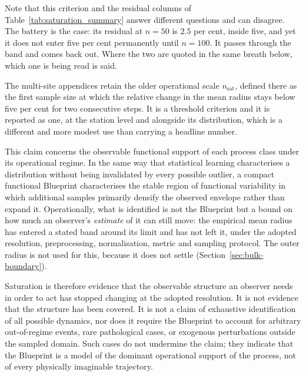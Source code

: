 \documentclass[10pt]{article}
\theoremstyle{plain}
\theoremstyle{definition}
\theoremstyle{remark}
\newcommand{\fitwidth}[1]{%
  \resizebox{\ifdim\width>\linewidth\linewidth\else\width\fi}{!}{#1}}
\begin{document}
Note that this criterion and the residual columns of
Table~\ref{tab:saturation_summary} answer different questions and can disagree.
The battery is the case: its residual at $n=50$ is $2.5$ per cent, inside five,
and yet it does not enter five per cent permanently until $n=100$. It passes
through the band and comes back out. Where the two are quoted in the same
breath below, which one is being read is said.

The multi-site appendices retain the older operational scale
$n_{\mathrm{sat}}$, defined there as the first sample size at which the relative
change in the mean radius stays below five per cent for two consecutive steps.
It is a threshold criterion and it is reported as one, at the station level and
alongside its distribution, which is a different and more modest use than
carrying a headline number.

This claim concerns the observable functional support of each process class 
under its operational regime. In the same way that statistical learning 
characterises a distribution without being invalidated by every possible 
outlier, a compact functional Blueprint characterises the stable region of 
functional variability in which additional samples primarily densify the 
observed envelope rather than expand it. Operationally, what is identified is not the Blueprint but a bound on how much
an observer's \emph{estimate} of it can still move: the empirical mean radius
has entered a stated band around its limit and has not left it, under the
adopted resolution, preprocessing, normalisation, metric and sampling protocol.
The outer radius is not used for this, because it does not settle
(Section~\ref{sec:bulk-boundary}).

Saturation is therefore evidence that the observable structure an observer needs
in order to act has stopped changing at the adopted resolution. It is not
evidence that the structure has been covered. 
It is not a claim of exhaustive identification of all possible dynamics, nor 
does it require the Blueprint to account for arbitrary out-of-regime events, 
rare pathological cases, or exogenous perturbations outside the sampled domain. 
Such cases do not undermine the claim; they indicate that the Blueprint is a 
model of the dominant operational support of the process, not of every 
physically imaginable trajectory.

\begin{table}[!htbp]\centering\small
\fitwidth{}
\caption{\small What each concept's radius settles at, and how far the
estimate still is from it. \emph{settles at} is the radius over every
realisation the row uses; \emph{residual} is $|r_n - r_\infty| / r_\infty$,
measured on realisations the observer has not seen. The spread in parentheses
is scatter over independent draws where the row has one concept, and scatter
\emph{across} concepts where it has several --- a different quantity, and large
where the concepts genuinely differ. No convergence threshold is applied: the
curve is reported and the reader reads the convergence off it.}
\label{tab:saturation_summary}
\end{table}
\end{document}
